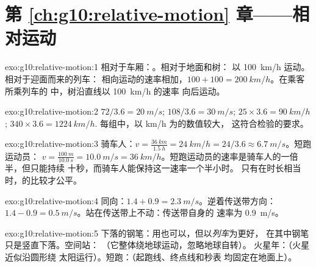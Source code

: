 \section*{第 \ref{ch:g10:relative-motion} 章——相对运动}

\begin{solution}{exo:g10:relative-motion:1}
相对于车厢：。相对于地面和树：
以 \qty{100}{km/h} 运动。相对于迎面而来的列车：
相向运动的速率相加，$100 + 100 = \qty{200}{km/h}$。在乘客所乘列车的
中，树沿直线以 \qty{100}{km/h} 的速率
向后运动。
\end{solution}

\begin{solution}{exo:g10:relative-motion:2}
$72 / 3.6 = \qty{20}{m/s}$; $108 / 3.6 = \qty{30}{m/s}$;
$25 \times 3.6 = \qty{90}{km/h}$; $340 \times 3.6 = \qty{1224}{km/h}$.
每组中，以 \unit{km/h} 为的数值较大，
这符合检验的要求。
\end{solution}

\begin{solution}{exo:g10:relative-motion:3}
骑车人：$v = \frac{\qty{36}{km}}{\qty{1.5}{h}} = \qty{24}{km/h}
= 24/3.6 \approx \qty{6.7}{m/s}$。短跑运动员：
$v = \frac{\qty{100}{m}}{\qty{10.0}{s}} = \qty{10.0}{m/s}
= \qty{36}{km/h}$。短跑运动员的速率是骑车人的一倍半，但只能持续
十秒，而骑车人能保持这一速率一个半小时。
只有在时长相当时，的比较才公平。
\end{solution}

\begin{solution}{exo:g10:relative-motion:4}
同向：$1.4 + 0.9 = \qty{2.3}{m/s}$。逆着传送带方向：
$1.4 - 0.9 = \qty{0.5}{m/s}$。站在传送带上不动：传送带自身的
速率为 \qty{0.9}{m/s}。
\end{solution}

\begin{solution}{exo:g10:relative-motion:5}
下落的钢笔：用也可以，但以\emph{列车}为更好，
在其中钢笔只是竖直下落。空间站：
（它整体绕地球运动，忽略地球自转）。
火星年：（火星近似沿圆形绕
太阳运行）。短跑：（起跑线、终点线和秒表
均固定在地面上）。
\end{solution}

